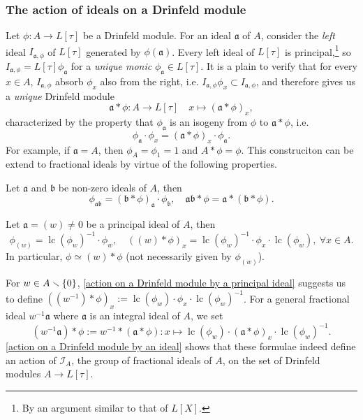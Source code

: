 \documentclass{article}
\DeclareMathOperator{\lc}{lc}
\begin{document}
\subsubsection{The action of ideals on a Drinfeld module}\label{sec: The action of an ideal on a Drinfeld module}
Let $\phi : A\to L[\tau]$ be a Drinfeld module.
For an ideal $\mathfrak{a}$ of $A$, consider the \textit{left} ideal
$I_{\mathfrak{a}, \phi}$ of $L[\tau]$ generated by $\phi(\mathfrak{a})$.
Every left ideal of $L[\tau]$ is principal,\footnote{
    By an argument similar to that of $L[X]$.
}
so $I_{\mathfrak{a}, \phi} = L[\tau]\phi_{\mathfrak{a}}$
for a \textit{unique monic} $\phi_\mathfrak{a}\in L[\tau]$.
It is a plain to verify that for every $x\in A$,
$I_{\mathfrak{a}, \phi}$ absorb $\phi_x$ also from the right,
i.e. $I_{\mathfrak{a}, \phi}\phi_x\subset I_{\mathfrak{a}, \phi}$,
and therefore gives us a \textit{unique} Drinfeld module \[\mathfrak{a}*\phi : A\to L[\tau]\quad x\mapsto (\mathfrak{a}*\phi)_x,\]
characterized by the property that $\phi_\mathfrak{a}$ is an isogeny from $\phi$ to $\mathfrak{a}*\phi$, i.e.\[\phi_\mathfrak{a}\cdot \phi_x = (\mathfrak{a}*\phi)_x\cdot\phi_\mathfrak{a}.\]
For example, if $\mathfrak{a} = A$, then $\phi_A = \phi_1 = 1$ and $A*\phi = \phi$.
This construciton can be extend to fractional ideals by virtue of the following properties.
\begin{lemma}\label{action on a Drinfeld module by an ideal}
    Let $\mathfrak{a}$ and $\mathfrak{b}$ be non-zero ideals of $A$,
    then\[
    \phi_{\mathfrak{ab}} = (\mathfrak{b}*\phi)_\mathfrak{a}\cdot \phi_{\mathfrak{b}},\quad \mathfrak{ab}*\phi = \mathfrak{a}*(\mathfrak{b}*\phi).\]
\end{lemma}
\begin{lemma}\label{action on a Drinfeld module by a principal ideal}
    Let $\mathfrak{a} = (w)\ne 0$ be a principal ideal of $A$,
    then \[
    \phi_{(w)} = \lc(\phi_w)^{-1}\cdot\phi_w,\quad 
    ((w)*\phi)_x = \lc(\phi_w)^{-1}\cdot\phi_x\cdot\lc(\phi_w),\ \forall x\in A.\]
    In particular, $\phi\simeq (w) * \phi$ (not necessarily given by $\phi_{(w)}$).
\end{lemma}


For $w\in A\smallsetminus \{0\}$,
\cref{action on a Drinfeld module by a principal ideal} suggests us to define
$\left( (w^{-1})*\phi \right)_x := \lc(\phi_w)\cdot\phi_x\cdot \lc(\phi_w)^{-1}$.
For a general fractional ideal $w^{-1}\mathfrak{a}$
where $\mathfrak{a}$ is an integral ideal of $A$,
we set \[(w^{-1}\mathfrak{a}) * \phi := w^{-1} * (\mathfrak{a} * \phi) : x\mapsto \lc(\phi_w)\cdot (\mathfrak{a} * \phi)_x\cdot \lc(\phi_w)^{-1}.\]
\cref{action on a Drinfeld module by an ideal} shows that these formulae indeed define an action of $\mathcal{I}_A$, the group of fractional ideals of $A$,
on the set of Drinfeld modules $A\to L[\tau]$.
\end{document}
